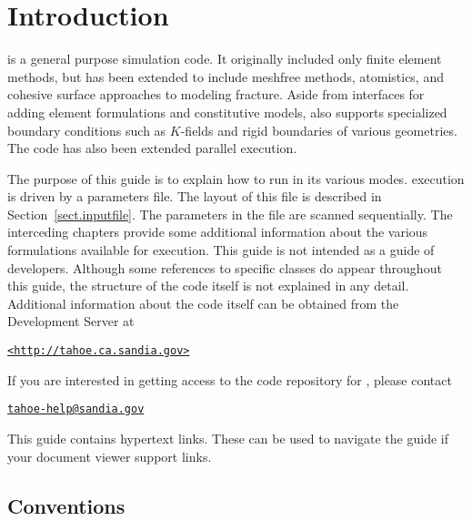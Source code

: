 
\section{Introduction}
\tahoe is a general purpose simulation code.  It originally included only
finite element methods, but has been extended to include meshfree methods,
atomistics, and cohesive surface approaches to modeling fracture.  Aside
from interfaces for adding element formulations and constitutive models,
\tahoe also supports specialized boundary conditions such as $K$-fields and
rigid boundaries of various geometries.  The code has also been extended
parallel execution.

The purpose of this guide is to explain how to run \tahoe in its various
modes.  \tahoe execution is driven by a parameters file.  The layout of this
file is described in Section~\ref{sect.inputfile}.  
The parameters in the file are scanned
sequentially.  The interceding chapters provide some additional information
about the various formulations available for execution.  This guide is not
intended as a guide of developers.  Although some references to specific
classes do appear throughout this guide, the structure of the code itself
is not explained in any detail.  Additional information about the code
itself can be obtained from the \tahoe Development Server at
\begin{center}
\href{http://tahoe.ca.sandia.gov}{\texttt{\textless http://tahoe.ca.sandia.gov\textgreater}}
\end{center}
If you are interested in getting access to the code repository for \tahoe, please contact
\begin{center}
\href{mailto:tahoe-help@sandia.gov}{\texttt{tahoe-help@sandia.gov}}
\end{center}
This guide contains hypertext links.  These can be used to navigate the
guide if your document viewer support links.

\subsection{Conventions}

